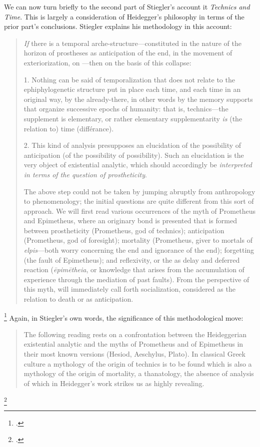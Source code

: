 \documentclass[letterpaper,notitlepage,12pt]{article}
\begin{document}
We can now turn briefly to the second part of Stiegler's account it
\textit{Technics and Time}.
This is largely a consideration of Heidegger's philosophy in terms of the prior
part's conclusions.
Stiegler explains his methodology in this account: \blockquote{\textit{If} there 
  is a temporal arche-structure---constituted in the  nature of the horizon of prostheses as anticipation of the end, in
the movement of exteriorization, on ---then on the basis of this collapse:

1. Nothing can be said of temporalization that does not relate to the
ephiphylogenetic structure put in place each time, and each time in an
original way, by the already-there, in other words by the memory supports that 
organize successive epochs of humanity: that is, technics---the
supplement is elementary, or rather elementary supplementarity \textit{is} (the
relation to) time (diff\'{e}rance).

2. This kind of analysis presupposes an elucidation of the possibility
of anticipation (of the possibility of possibility). Such an elucidation is
the very object of existential analytic, which should accordingly be 
\textit{interpreted in terms of the question of prostheticity}.

The above step could not be taken by jumping abruptly from anthropology to 
phenomenology; the initial questions are quite different from this sort of 
approach. We will first read various occurrences of the myth
of Prometheus and Epimetheus, where an originary bond is presented
that is formed between prostheticity (Prometheus, god of technics); anticipation
(Prometheus, god of foresight); mortality (Prometheus, giver
to mortals of \textit{elpis}---both worry concerning the end and ignorance of the
end); forgetting (the fault of Epimetheus); and reflexivity, or the
 as delay and deferred reaction
(\textit{\={e}pim\={e}theia}, or knowledge that arises from the accumulation of 
experience through the mediation of past faults). From the perspective of this
myth,  will immediately call forth socialization, 
considered as the relation to death or as anticipation.}\footcite[p.
183--4]{stiegler_technics_1998}
Again, in Stiegler's own words, the significance of this methodological move:
\blockquote{The following reading rests on a confrontation between the 
  Heideggerian existential analytic and the myths of Prometheus and of
Epimetheus in their most known versions (Hesiod, Aeschylus, Plato). In
classical Greek culture a mythology of the origin of technics is to be
found which is also a mythology of the origin of mortality, a thanatology, the 
absence of analysis of which in Heidegger's work strikes us as
highly revealing.}\footcite[p. 16]{stiegler_technics_1998}
\end{document}
